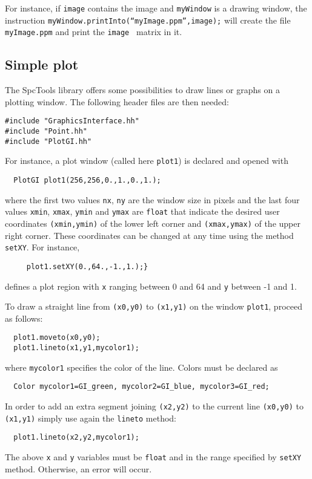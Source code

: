 \documentclass[12pt,a4paper]{article}
\begin{document}
For instance, if {\tt image} contains the image and {\tt myWindow} is a drawing window,
the instruction  {\tt myWindow.printInto(``myImage.ppm'',image);} will create the
file {\tt myImage.ppm} and print the {\tt image } matrix in it.

\subsection{Simple plot}

The SpcTools library offers some possibilities to draw lines or graphs on a plotting window.
The following header files are then needed:
\begin{verbatim}
#include "GraphicsInterface.hh"
#include "Point.hh"
#include "PlotGI.hh"
\end{verbatim}

For instance, a plot window (called here {\tt plot1}) is declared and opened with
\begin{verbatim}
  PlotGI plot1(256,256,0.,1.,0.,1.);
\end{verbatim}
where the first two values {\tt nx}, {\tt ny} are the window size in pixels and the
last four values {\tt xmin}, {\tt xmax}, {\tt ymin} and {\tt ymax} are {\tt float} that
indicate the desired user coordinates {\tt (xmin,ymin)} of the lower left corner and
{\tt (xmax,ymax)} of the upper right corner. These coordinates can be changed at any time
using the method {\tt setXY}. For instance, 
\begin{verbatim}
     plot1.setXY(0.,64.,-1.,1.);} 
\end{verbatim}
defines a plot region with {\tt x} ranging between 0 and 64 and
{\tt y} between -1 and 1.

To draw a straight line from {\tt (x0,y0)} to {\tt (x1,y1)} on the window {\tt plot1}, 
proceed as follows:
\begin{verbatim}
  plot1.moveto(x0,y0);
  plot1.lineto(x1,y1,mycolor1);
\end{verbatim}
where {\tt mycolor1} specifies the color of the line. Colors must be declared as
\begin{verbatim}
  Color mycolor1=GI_green, mycolor2=GI_blue, mycolor3=GI_red;
\end{verbatim}
In order to add an extra segment joining {\tt (x2,y2)} to the current
line {\tt (x0,y0)} to {\tt (x1,y1)} simply use again the {\tt lineto} method:
\begin{verbatim}
  plot1.lineto(x2,y2,mycolor1);
\end{verbatim}
The above  {\tt x} and {\tt y} variables must be {\tt float} and in the range specified by
{\tt setXY} method. Otherwise, an error will occur.
\end{document}
